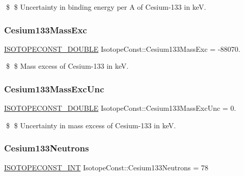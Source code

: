 \$ \$ Uncertainty in binding energy per A of Cesium-\/133 in keV. \mbox{\label{group___isotope_const-_cesium-_cs133_ga8c3c6ea44feedf58e22e2d443b43b06f}} 
\subsubsection{\texorpdfstring{Cesium133\+Mass\+Exc}{Cesium133MassExc}}
{\footnotesize\ttfamily \mbox{\hyperlink{group___isotope_const-_macros_ga8f45a7272ce02c0b4c65c44636ed719a}{I\+S\+O\+T\+O\+P\+E\+C\+O\+N\+S\+T\+\_\+\+D\+O\+U\+B\+LE}} Isotope\+Const\+::\+Cesium133\+Mass\+Exc = -\/88070.}

\$ \$ Mass excess of Cesium-\/133 in keV. \mbox{\label{group___isotope_const-_cesium-_cs133_ga7b3b7690062fc485d40795eb5458ddce}} 
\subsubsection{\texorpdfstring{Cesium133\+Mass\+Exc\+Unc}{Cesium133MassExcUnc}}
{\footnotesize\ttfamily \mbox{\hyperlink{group___isotope_const-_macros_ga8f45a7272ce02c0b4c65c44636ed719a}{I\+S\+O\+T\+O\+P\+E\+C\+O\+N\+S\+T\+\_\+\+D\+O\+U\+B\+LE}} Isotope\+Const\+::\+Cesium133\+Mass\+Exc\+Unc = 0.}

\$ \$ Uncertainty in mass excess of Cesium-\/133 in keV. \mbox{\label{group___isotope_const-_cesium-_cs133_gaf09aa83a497f52f343cacd3935fcdf94}} 
\subsubsection{\texorpdfstring{Cesium133\+Neutrons}{Cesium133Neutrons}}
{\footnotesize\ttfamily \mbox{\hyperlink{group___isotope_const-_macros_ga5f18360b3e99483a35c32d789e62621c}{I\+S\+O\+T\+O\+P\+E\+C\+O\+N\+S\+T\+\_\+\+I\+NT}} Isotope\+Const\+::\+Cesium133\+Neutrons = 78}

